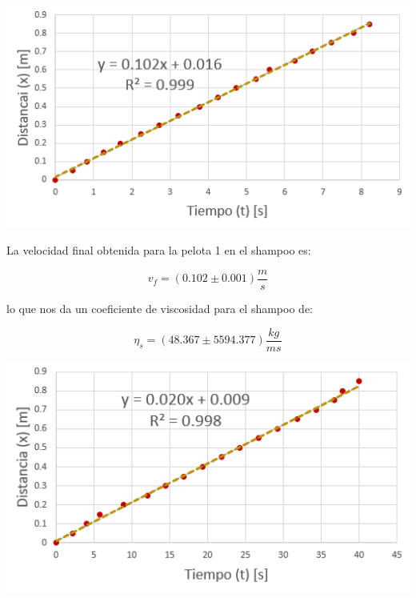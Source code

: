 \documentclass[DIV=calc, paper=a4, fontsize=11pt]{scrartcl}
\newenvironment{Figura}
  {\par\medskip\noindent\minipage{\linewidth}}
  {\endminipage\par\medskip}
\begin{document}
\begin{multicols}{2}
\begin{Figura}
\centering
    \includegraphics[width=1\textwidth]{graficas/1 shampoo.PNG}
    \label{fig}
\end{Figura}

La velocidad final obtenida para la pelota 1 en el shampoo es:

\begin{equation*}
    v_f = (0.102 \pm 0.001) \frac{m}{s}
\end{equation*}

lo que nos da un coeficiente de viscosidad para el shampoo de:

\begin{equation*}
    \eta_{s} = (48.367 \pm 5594.377) \frac{kg}{ms}
\end{equation*}


\begin{Figura}
\centering
    \includegraphics[width=1\textwidth]{graficas/2 shampoo.PNG}
    \label{fig}
\end{Figura}


\end{multicols}
\end{document}
